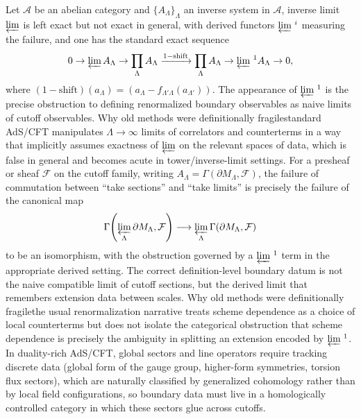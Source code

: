\documentclass[11pt]{article}
\theoremstyle{remark}
\begin{document}
Let \(\mathcal{A}\) be an abelian category and \(\{A_{\Lambda}\}_{\Lambda}\) an inverse system in \(\mathcal{A}\), inverse limit \(\varprojlim\) is left exact but not exact in general, with derived functors \(\varprojlim{}^{\,i}\) measuring the failure, and one has the standard exact sequence
\begin{equation}\label{eq:lim1-seq}
0\to \varprojlim A_{\Lambda}\to \prod_{\Lambda} A_{\Lambda}\xrightarrow{1-\mathrm{shift}}\prod_{\Lambda}A_{\Lambda}\to \varprojlim{}^{\,1}A_{\Lambda}\to 0,
\end{equation}
where \((1-\mathrm{shift})(a_{\Lambda})=(a_{\Lambda}-f_{\Lambda'\Lambda}(a_{\Lambda'}))\). The appearance of \(\varprojlim{}^{\,1}\) is the precise obstruction to defining renormalized boundary observables as naive limits of cutoff observables. Why old methods were definitionally fragile\:standard AdS/CFT manipulates \(\Lambda\to\infty\) limits of correlators and counterterms in a way that implicitly assumes exactness of \(\varprojlim\) on the relevant spaces of data, which is false in general and becomes acute in tower/inverse-limit settings. For a presheaf or sheaf \(\mathcal{F}\) on the cutoff family, writing \(A_{\Lambda}=\Gamma(\partial M_{\Lambda},\mathcal{F})\), the failure of commutation between ``take sections'' and ``take limits'' is precisely the failure of the canonical map
\begin{equation}\label{eq:sections-vs-lim}
\Gamma\!\left(\varprojlim_{\Lambda}\partial M_{\Lambda},\mathcal{F}\right)\longrightarrow \varprojlim_{\Lambda}\Gamma(\partial M_{\Lambda},\mathcal{F})
\end{equation}
to be an isomorphism, with the obstruction governed by a \(\varprojlim{}^{\,1}\) term in the appropriate derived setting. The correct definition-level boundary datum is not the naive compatible limit of cutoff sections, but the derived limit that remembers extension data between scales. Why old methods were definitionally fragile\:the usual renormalization narrative treats scheme dependence as a choice of local counterterms but does not isolate the categorical obstruction that scheme dependence is precisely the ambiguity in splitting an extension encoded by \(\varprojlim{}^{\,1}\). In duality-rich AdS/CFT, global sectors and line operators require tracking discrete data (global form of the gauge group, higher-form symmetries, torsion flux sectors), which are naturally classified by generalized cohomology rather than by local field configurations, so boundary data must live in a homologically controlled category in which these sectors glue across cutoffs. 
\end{document}
